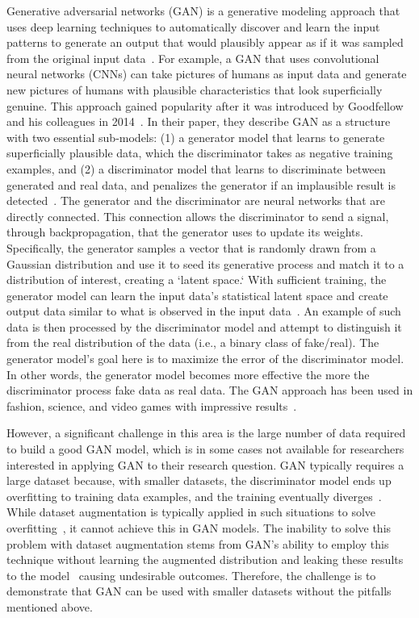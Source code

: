 \documentclass{report}
\begin{document}
Generative adversarial networks (GAN) is a generative modeling approach that uses deep learning techniques to automatically discover and learn the input patterns to generate an output that would plausibly appear as if it was sampled from the original input data~\cite{goodfellow2014generative}. For example, a GAN that uses convolutional neural networks (CNNs) can take pictures of humans as input data and generate new pictures of humans with plausible characteristics that look superficially genuine. This approach gained popularity after it was introduced by Goodfellow and his colleagues in 2014~\cite{goodfellow2014generative}. In their paper, they describe GAN as a structure with two essential sub-models: (1) a generator model that learns to generate superficially plausible data, which the discriminator takes as negative training examples, and (2) a discriminator model that learns to discriminate between generated and real data, and penalizes the generator if an implausible result is detected~\cite{creswell2018generative}. The generator and the discriminator are neural networks that are directly connected. This connection allows the discriminator to send a signal, through backpropagation, that the generator uses to update its weights. Specifically, the generator samples a vector that is randomly drawn from a Gaussian distribution and use it to seed its generative process and match it to a distribution of interest, creating a `latent space.` With sufficient training, the generator model can learn the input data's statistical latent space and create output data similar to what is observed in the input data~\cite{radford2015unsupervised}. An example of such data is then processed by the discriminator model and attempt to distinguish it from the real distribution of the data (i.e., a binary class of fake/real). The generator model's goal here is to maximize the error of the discriminator model. In other words, the generator model becomes more effective the more the discriminator process fake data as real data. The GAN approach has been used in fashion, science, and video games with impressive results~\cite{gui2020review}.

However, a significant challenge in this area is the large number of data required to build a good GAN model, which is in some cases not available for researchers interested in applying GAN to their research question. GAN typically requires a large dataset because, with smaller datasets, the discriminator model ends up overfitting to training data examples, and the training eventually diverges~\cite{zhao2020improved}. While dataset augmentation is typically applied in such situations to solve overfitting~\cite{shorten2019survey}, it cannot achieve this in GAN models. The inability to solve this problem with dataset augmentation stems from GAN's ability to employ this technique without learning the augmented distribution and leaking these results to the model~\cite{zhao2020improved} causing undesirable outcomes. Therefore, the challenge is to demonstrate that GAN can be used with smaller datasets without the pitfalls mentioned above.
\end{document}

